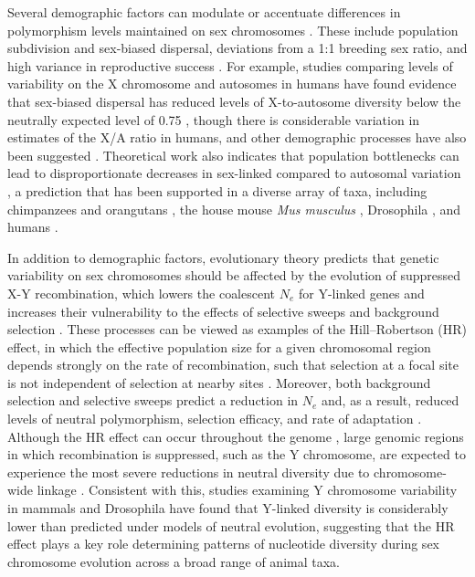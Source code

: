 \documentclass[9pt,twocolumn,twoside]{gsajnl}
\begin{document}
Several demographic factors can modulate or accentuate differences in polymorphism levels maintained on sex chromosomes \citep{ellegren2009}. These include population subdivision and sex-biased dispersal, deviations from a 1:1 breeding sex ratio, and high variance in reproductive success \citep{caballero1995,charlesworth2001,laporte2002,pool2007}. For example, studies comparing levels of variability on the X chromosome and autosomes in humans have found evidence that sex-biased dispersal has reduced levels of X-to-autosome diversity below the neutrally expected level of 0.75 \citep{keinan2009}, though there is considerable variation in estimates of the X/A ratio in humans, and other demographic processes have also been suggested \citep{hammer2010,bustamante2009}. Theoretical work also indicates that population bottlenecks can lead to disproportionate decreases in sex-linked compared to autosomal variation \citep{pool2007}, a prediction that has been supported in a diverse array of taxa, including chimpanzees and orangutans \citep{kaessmann2001,fischer2006}, the house mouse \textit{Mus musculus} \citep{baines2007}, Drosophila \citep{andolfatto2001}, and humans \citep{keinan2009}.

In addition to demographic factors, evolutionary theory predicts that genetic variability on sex chromosomes should be affected by the evolution of suppressed X-Y recombination, which lowers the coalescent $N_{e}$ for Y-linked genes and increases their vulnerability to the effects of selective sweeps \citep{smith1974hitch,aquadro1994} and background selection \citep{charlesworth1996background,charlesworth1994effect}. These processes can be viewed as examples of the Hill–Robertson (HR) effect, in which the effective population size for a given chromosomal region depends strongly on the rate of recombination, such that selection at a focal site is not independent of selection at nearby sites \citep{hill1966HReffect}. Moreover, both background selection and selective sweeps predict a reduction in $N_{e}$ and, as a result, reduced levels of neutral polymorphism, selection efficacy, and rate of adaptation \citep{comeron2008}. Although the HR effect can occur throughout the genome \citep{mcvean2000}, large genomic regions in which recombination is suppressed, such as the Y chromosome, are expected to experience the most severe reductions in neutral diversity due to chromosome-wide linkage \citep{charlesworth1996CB,charlesworth2000degeneration,bachtrog2013NRG}. Consistent with this, studies examining Y chromosome variability in mammals \citep{hellborg2004,Wilsonsayres2014} and Drosophila \citep{mcallister1999,bachtrog2000} have found that Y-linked diversity is considerably lower than predicted under models of neutral evolution, suggesting that the HR effect plays a key role determining patterns of nucleotide diversity during sex chromosome evolution across a broad range of animal taxa.
\end{document}
